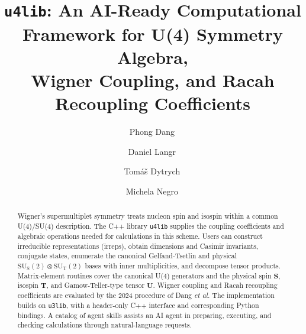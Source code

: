 \documentclass[aps,onecolumn,10pt,superscriptaddress,floatfix,nofootinbib]{revtex4}
\begin{document}
\title{\texttt{u4lib}: An AI-Ready Computational Framework for U(4) Symmetry Algebra,\\ Wigner Coupling, and Racah Recoupling Coefficients}

\author{Phong Dang\,}

\author{Daniel Langr\,}

\author{Tom\'{a}\v{s} Dytrych\,}

\author{Michela Negro\,}

\begin{abstract}
Wigner's supermultiplet symmetry treats nucleon spin and isospin within a
common U(4)/SU(4) description. The C++ library \texttt{u4lib} supplies the
coupling coefficients and algebraic operations needed for calculations in this
scheme. 
Users can construct irreducible representations (irreps), obtain dimensions and Casimir
invariants, conjugate states, enumerate the canonical Gelfand-Tsetlin and physical 
$\mathrm{SU_S(2)}\otimes\mathrm{SU_T(2)}$ bases with inner multiplicities, and decompose
tensor products. Matrix-element routines cover the canonical U(4) generators
and the physical spin $\mathbf{S}$, isospin $\mathbf{T}$, and
Gamow-Teller-type tensor $\mathbf{U}$. Wigner coupling and Racah recoupling
coefficients are evaluated by the 2024 procedure of Dang \textit{et al.} 
The implementation builds on \texttt{u3lib}, with a
header-only C++ interface and corresponding Python bindings. A catalog of
agent skills assists an AI agent in preparing, executing, and checking
calculations through natural-language requests. 

\end{abstract}
\end{document}
